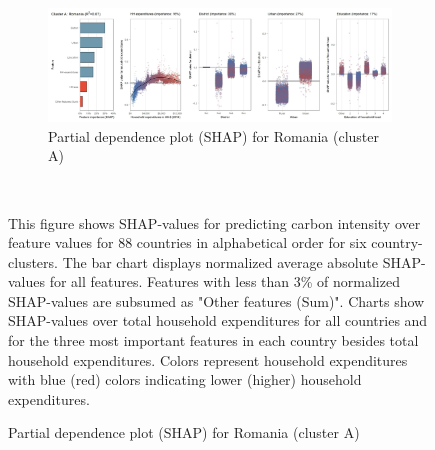 \begin{figure}[ht!]
    \\
    \vspace{0.5cm}
   \begin{subfigure}[b]{\textwidth}
         \centering
         \caption{Partial dependence plot (SHAP) for Romania (cluster A)}
         \label{fig:5b_ROU}
         \includegraphics[width=\textwidth]{Figure 5b/Figure_5b_ROU}
         \end{subfigure}
    \\
    \vspace{0.5cm}
   
    \begin{subcaption2}
     This figure shows SHAP-values for predicting carbon intensity over feature values for 88 countries in alphabetical order for six country-clusters. The bar chart displays normalized average absolute SHAP-values for all features. Features with less than 3\% of normalized SHAP-values are subsumed as "Other features (Sum)". Charts show SHAP-values over total household expenditures for all countries and for the three most important features in each country besides total household expenditures. Colors represent household expenditures with blue (red) colors indicating lower (higher) household expenditures.
     \end{subcaption2}
\end{figure}


